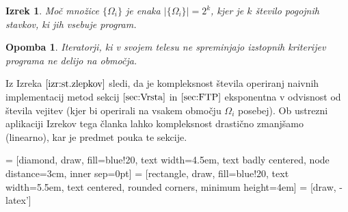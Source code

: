 \documentclass{article}
\newtheorem{izrek}{Izrek}[section]
\newtheorem{opomba}{Opomba}[section]
\begin{document}
\begin{izrek}\label{izr:st.zlepkov}
Moč množice $\{\Omega_i\}$ je enaka $\lvert\{\Omega_i \}\rvert=2^k$, kjer je $k$ število pogojnih stavkov, ki jih vsebuje program.
\end{izrek}
\begin{opomba}
Iteratorji, ki v svojem telesu ne spreminjajo izstopnih kriterijev programa ne delijo na območja.
\end{opomba}
Iz Izreka $\ref{izr:st.zlepkov}$ sledi, da je kompleksnost števila operiranj naivnih implementacij metod sekcij $\ref{sec:Vrsta}$ in $\ref{sec:FTP}$ eksponentna v odvisnost od števila vejitev (kjer bi operirali na vsakem območju $\Omega_i$ posebej). Ob ustrezni aplikaciji Izrekov tega članka lahko kompleksnost drastično zmanjšamo (linearno), kar je predmet pouka te sekcije.
\vspace{10px}

 = [diamond, draw, fill=blue!20, 
    text width=4.5em, text badly centered, node distance=3cm, inner sep=0pt]
 = [rectangle, draw, fill=blue!20, 
    text width=5.5em, text centered, rounded corners, minimum height=4em]
 = [draw, -latex']
\end{document}
